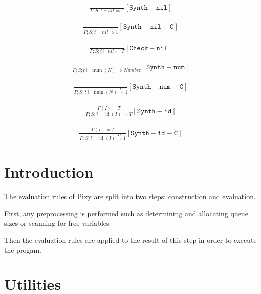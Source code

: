 \documentclass{scrartcl}
\DeclareMathOperator{\num}{num}
\DeclareMathOperator{\id}{id}
\begin{document}
    \begin{align*}
    \frac{}{
        \Gamma; S; t \vdash nil \Rightarrow 1
    }[\mathtt{Synth-nil}]
    \end{align*}
    
    \begin{align*}
    \frac{}{
        \Gamma; S; t \vdash nil \overset{C}{\Rightarrow} 1
    }[\mathtt{Synth-nil-C}]
    \end{align*}
    
    \begin{align*}
    \frac{}{
        \Gamma; S; t \vdash nil \Leftarrow T
    }[\mathtt{Check-nil}]
    \end{align*}
    
    \begin{align*}
    \frac{}{
        \Gamma; S; t \vdash \num(N) \Rightarrow Number
    }[\mathtt{Synth-num}]
    \end{align*}
    
    \begin{align*}
    \frac{}{
        \Gamma; S; t \vdash \num(N) \overset{C}{\Rightarrow} 1
    }[\mathtt{Synth-num-C}]
    \end{align*}
    
    \begin{align*}
    \frac{
        \Gamma(I) = T
    }{
        \Gamma; S; t \vdash \id(I) \Rightarrow T
    }[\mathtt{Synth-id}]
    \end{align*}
    
    \begin{align*}
    \frac{
        \Gamma(I) = T
    }{
        \Gamma; S; t \vdash \id(I) \overset{C}{\Rightarrow} 1
    }[\mathtt{Synth-id-C}]
    \end{align*}
    
    \section{Introduction}
    
    The evaluation rules of Pixy are split into two steps: construction and evaluation.
    
    First, any preprocessing is performed such as determining and allocating queue sizes or scanning for free variables.
    
    Then the evaluation rules are applied to the result of this step in order to execute the progam.
    
    \section{Utilities}
    
\end{document}
